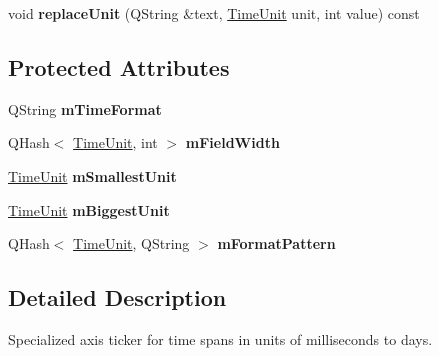 \begin{DoxyCompactItemize}
\item 
void {\bfseries replace\+Unit} (Q\+String \&text, \hyperlink{class_q_c_p_axis_ticker_time_a5c48ded8c6d3a1aca9b68219469fea3e}{Time\+Unit} unit, int value) const \hypertarget{class_q_c_p_axis_ticker_time_a71896eb1fd7eafaba911245c048857e1}{}\label{class_q_c_p_axis_ticker_time_a71896eb1fd7eafaba911245c048857e1}

\end{DoxyCompactItemize}
\subsection*{Protected Attributes}
\begin{DoxyCompactItemize}
\item 
Q\+String {\bfseries m\+Time\+Format}\hypertarget{class_q_c_p_axis_ticker_time_a800af3fe0a7c1a8110c043b82169bc9d}{}\label{class_q_c_p_axis_ticker_time_a800af3fe0a7c1a8110c043b82169bc9d}

\item 
Q\+Hash$<$ \hyperlink{class_q_c_p_axis_ticker_time_a5c48ded8c6d3a1aca9b68219469fea3e}{Time\+Unit}, int $>$ {\bfseries m\+Field\+Width}\hypertarget{class_q_c_p_axis_ticker_time_a85c3c25b92d5ff64a59b475f32d03154}{}\label{class_q_c_p_axis_ticker_time_a85c3c25b92d5ff64a59b475f32d03154}

\item 
\hyperlink{class_q_c_p_axis_ticker_time_a5c48ded8c6d3a1aca9b68219469fea3e}{Time\+Unit} {\bfseries m\+Smallest\+Unit}\hypertarget{class_q_c_p_axis_ticker_time_a61033c493cec76a69628d1aaa5b07abf}{}\label{class_q_c_p_axis_ticker_time_a61033c493cec76a69628d1aaa5b07abf}

\item 
\hyperlink{class_q_c_p_axis_ticker_time_a5c48ded8c6d3a1aca9b68219469fea3e}{Time\+Unit} {\bfseries m\+Biggest\+Unit}\hypertarget{class_q_c_p_axis_ticker_time_a349b2debe07adc591996aa73dec9a757}{}\label{class_q_c_p_axis_ticker_time_a349b2debe07adc591996aa73dec9a757}

\item 
Q\+Hash$<$ \hyperlink{class_q_c_p_axis_ticker_time_a5c48ded8c6d3a1aca9b68219469fea3e}{Time\+Unit}, Q\+String $>$ {\bfseries m\+Format\+Pattern}\hypertarget{class_q_c_p_axis_ticker_time_a84f4e4a2c6b7d3e4c1bf66a2432b541f}{}\label{class_q_c_p_axis_ticker_time_a84f4e4a2c6b7d3e4c1bf66a2432b541f}

\end{DoxyCompactItemize}


\subsection{Detailed Description}
Specialized axis ticker for time spans in units of milliseconds to days. 



